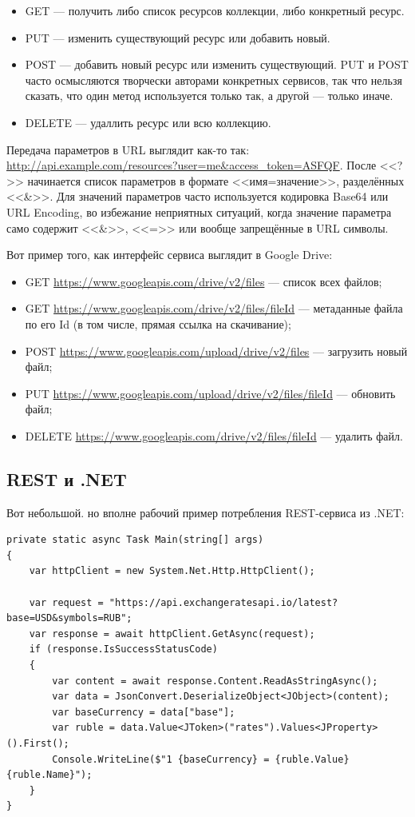 \documentclass[a5paper]{article}
\begin{document}
\begin{itemize}
    \item GET --- получить либо список ресурсов коллекции, либо конкретный ресурс.
    \item PUT --- изменить существующий ресурс или добавить новый.
    \item POST --- добавить новый ресурс или изменить существующий. PUT и POST часто осмысляются творчески авторами конкретных сервисов, так что нельзя сказать, что один метод используется только так, а другой --- только иначе.
    \item DELETE --- удаллить ресурс или всю коллекцию.
\end{itemize}

Передача параметров в URL выглядит как-то так: \url{http://api.example.com/resources?user=me\&access\_token=ASFQF}. После <<?>> начинается список параметров в формате <<имя=значение>>, разделённых <<\&>>. Для значений параметров часто используется кодировка Base64 или URL Encoding, во избежание неприятных ситуаций, когда значение параметра само содержит <<\&>>, <<=>> или вообще запрещённые в URL символы.

Вот пример того, как интерфейс сервиса выглядит в Google Drive:

\begin{itemize}
    \item GET \url{https://www.googleapis.com/drive/v2/files} --- список всех файлов;
    \item GET \url{https://www.googleapis.com/drive/v2/files/fileId} --- метаданные файла по его Id (в том числе, прямая ссылка на скачивание);
    \item POST \url{https://www.googleapis.com/upload/drive/v2/files} — загрузить новый файл;
    \item PUT \url{https://www.googleapis.com/upload/drive/v2/files/fileId} --- обновить файл;
    \item DELETE \url{https://www.googleapis.com/drive/v2/files/fileId} --- удалить файл.
\end{itemize}

\subsection{REST и .NET}

Вот небольшой. но вполне рабочий пример потребления REST-сервиса из .NET:

\begin{verbatim}
private static async Task Main(string[] args)
{
    var httpClient = new System.Net.Http.HttpClient();

    var request = "https://api.exchangeratesapi.io/latest?base=USD&symbols=RUB";
    var response = await httpClient.GetAsync(request);
    if (response.IsSuccessStatusCode)
    {
        var content = await response.Content.ReadAsStringAsync();
        var data = JsonConvert.DeserializeObject<JObject>(content);
        var baseCurrency = data["base"];
        var ruble = data.Value<JToken>("rates").Values<JProperty>().First();
        Console.WriteLine($"1 {baseCurrency} = {ruble.Value} {ruble.Name}");
    }
}
\end{verbatim}
\end{document}
